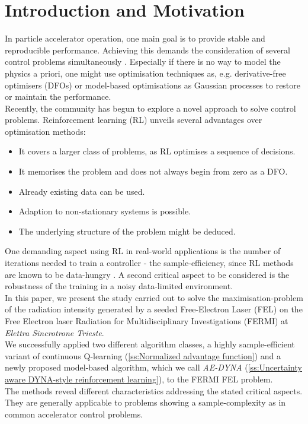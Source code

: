\documentclass[
reprint,
amsmath,amssymb,amsfonts,clevref,
aps,
prstab,
]{revtex4-2}
\begin{document}
	\section{Introduction and Motivation}
	In particle accelerator operation, one main goal is to provide stable and reproducible performance. Achieving this demands the consideration of several control problems simultaneously \cite{Kain2020,Scheinker2018}. Especially if there is no way to model the physics a priori, one might use optimisation techniques as, e.g. derivative-free optimisers (DFOs) \cite{Huang2013,Bruchon2017,Scheinker2020,Hirlaender2019,Welsch2015,Albright2019} or model-based optimisations as Gaussian processes \cite{Hanuka2020,Roussel2020} to restore or maintain the performance.\\
	Recently, the community has begun to explore a novel approach to solve control problems. Reinforcement learning (RL) \cite{Bruchon2020,Bruchon2019,Kain2020,Pang2020,John2020} unveils several advantages over optimisation methods:
	\begin{itemize}
		\item It covers a larger class of problems, as RL optimises a sequence of decisions.
		\item It memorises the problem and does not always begin from zero as a DFO.
		\item Already existing data can be used.
		\item Adaption to non-stationary systems is possible.
		\item The underlying structure of the problem might be deduced.
	\end{itemize}
	One demanding aspect using RL in real-world applications is the number of iterations needed to train a controller - the sample-efficiency, since RL methods are known to be data-hungry \cite{Sutton2018,DulacArnold2019}. A second critical aspect to be considered is the robustness of the training in a noisy data-limited environment.\\
	In this paper, we present the study carried out to solve the maximisation-problem of the radiation intensity generated by a seeded Free-Electron Laser (FEL) on the Free Electron laser Radiation for Multidisciplinary Investigations (FERMI) at \emph{Elettra Sincrotrone Trieste}.\\
	We successfully applied two different algorithm classes, a highly sample-efficient variant of continuous Q-learning (\cref{ss:Normalized advantage function}) and a newly proposed model-based algorithm, which we call \emph{AE-DYNA} (\cref{ss:Uncertainty aware DYNA-style reinforcement learning}), to the FERMI FEL problem.\\ The methods reveal different characteristics addressing the stated critical aspects. They are generally applicable to problems showing a sample-complexity as in common accelerator control problems.
\end{document}
